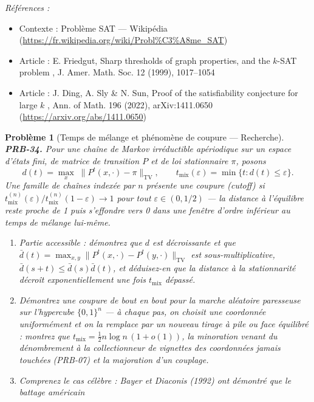 \documentclass[11pt]{article}
\newtheorem{problem}{Problème}
\newenvironment{refs}{\par\small\noindent\emph{Références :}\begin{itemize}\setlength\itemsep{0pt}}{\end{itemize}\normalsize}
\begin{document}
\begin{refs}
\item Contexte : Problème SAT --- Wikipédia (\url{https://fr.wikipedia.org/wiki/Probl%C3%A8me_SAT})
\item Article : E. Friedgut, \og{} Sharp thresholds of graph properties, and the $ k $-SAT problem \fg{}, J. Amer. Math. Soc. 12 (1999), 1017--1054
\item Article : J. Ding, A. Sly \& N. Sun, \og{} Proof of the satisfiability conjecture for large $ k $ \fg{}, Ann. of Math. 196 (2022), arXiv:1411.0650 (\url{https://arxiv.org/abs/1411.0650})
\end{refs}

\bigskip

\begin{problem}[{Temps de mélange et phénomène de coupure --- Recherche}]
\textbf{PRB-34.} Pour une chaîne de Markov irréductible apériodique sur un espace d'états fini,
de matrice de transition $ P $ et de loi stationnaire $ \pi $, posons
\[ d(t) = \max_{x} \; \big\lVert P^t(x, \cdot) - \pi \big\rVert_{\mathrm{TV}} ,
\qquad t_{\mathrm{mix}}(\varepsilon) = \min\{ t : d(t) \le \varepsilon \} . \]
Une \textit{famille} de chaînes indexée par $ n $ présente une \textit{coupure} (cutoff) si
$ t_{\mathrm{mix}}^{(n)}(\varepsilon) / t_{\mathrm{mix}}^{(n)}(1-\varepsilon) \to 1 $ pour tout
$ \varepsilon \in (0, 1/2) $ --- la distance à l'équilibre reste proche de 1 puis s'effondre vers 0
dans une fenêtre d'ordre inférieur au temps de mélange lui-même.
\begin{enumerate}
\item[(i)] Partie accessible : démontrez que $ d $ est décroissante et que
$ \bar{d}(t) = \max_{x,y} \lVert P^t(x,\cdot) - P^t(y,\cdot) \rVert_{\mathrm{TV}} $ est
sous-multiplicative, $ \bar{d}(s+t) \le \bar{d}(s)\bar{d}(t) $, et déduisez-en que la distance à
la stationnarité décroît exponentiellement une fois $ t_{\mathrm{mix}} $ dépassé.
\item[(ii)] Démontrez une coupure de bout en bout pour la marche aléatoire paresseuse sur l'hypercube
$ \{0,1\}^n $ --- à chaque pas, on choisit une coordonnée uniformément et on la remplace par un
nouveau tirage à pile ou face équilibré : montrez que
$ t_{\mathrm{mix}} = \tfrac12 n \log n\,(1+o(1)) $, la minoration venant du dénombrement à la
collectionneur de vignettes des coordonnées jamais touchées (PRB-07) et la majoration d'un
couplage.
\item[(iii)] Comprenez le cas célèbre : Bayer et Diaconis (1992) ont démontré que le battage américain

\end{enumerate}
\end{problem}
\end{document}
